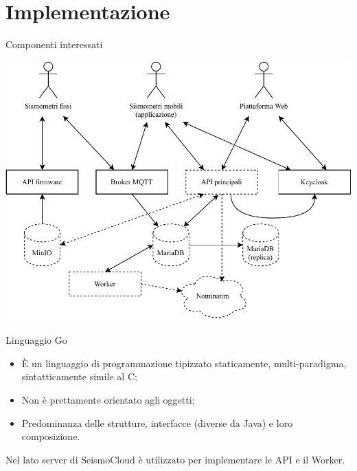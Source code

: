 \documentclass[compress]{beamer}
\begin{document}
\section{Implementazione}

\begin{frame}[c]{Componenti interessati}
\begin{center}
\includegraphics[width=0.9\linewidth]{assets/04/architettura-modify.pdf}
\end{center}
\end{frame}

\begin{frame}[c]{Linguaggio Go}
\begin{itemize}
\item È un linguaggio di programmazione tipizzato staticamente, multi-paradigma, sintatticamente simile al C;
\item Non è prettamente orientato agli oggetti;
\item Predominanza delle strutture, interfacce (diverse da Java) e loro composizione.
\end{itemize}

\vspace{1em}

Nel lato server di SeismoCloud è utilizzato per implementare le API e il Worker.

\end{frame}
\end{document}

